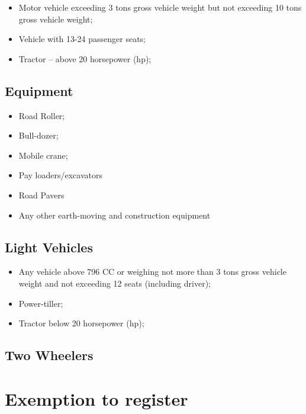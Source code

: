 \documentclass[
]{book}
\providecommand{\tightlist}{%
  \setlength{\itemsep}{0pt}\setlength{\parskip}{0pt}}
\begin{document}
\begin{itemize}
\tightlist
\item
  Motor vehicle exceeding 3 tons gross vehicle weight but not exceeding 10 tons gross vehicle weight;
\item
  Vehicle with 13-24 passenger seats;
\item
  Tractor -- above 20 horsepower (hp);
\end{itemize}

\hypertarget{equipment}{%
\subsection{Equipment}\label{equipment}}

\begin{itemize}
\tightlist
\item
  Road Roller;
\item
  Bull-dozer;
\item
  Mobile crane;
\item
  Pay loaders/excavators
\item
  Road Pavers
\item
  Any other earth-moving and construction equipment
\end{itemize}

\hypertarget{light-vehicles}{%
\subsection{Light Vehicles}\label{light-vehicles}}

\begin{itemize}
\tightlist
\item
  Any vehicle above 796 CC or weighing not more than 3 tons gross vehicle weight and not exceeding 12 seats (including driver);
\item
  Power-tiller;
\item
  Tractor below 20 horsepower (hp);
\end{itemize}

\hypertarget{two-wheelers}{%
\subsection{Two Wheelers}\label{two-wheelers}}

\hypertarget{exemption-to-register}{%
\section{Exemption to register}\label{exemption-to-register}}
\end{document}

